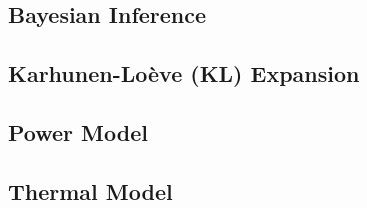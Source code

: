 \subsection{Bayesian Inference} 


\subsection{Karhunen-Lo\`{e}ve (KL) Expansion} 


\subsection{Power Model} 


\subsection{Thermal Model} 

